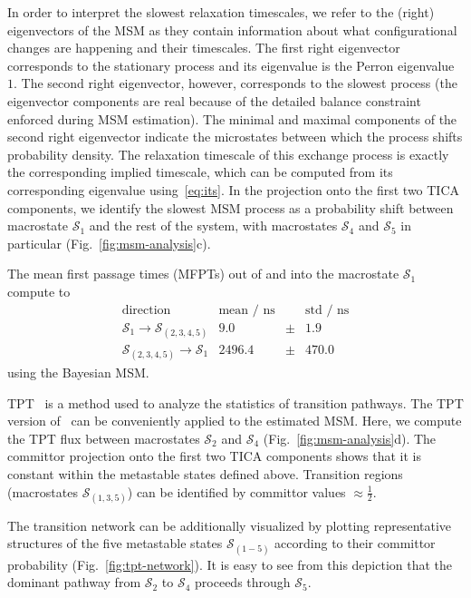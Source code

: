 \documentclass[9pt,tutorial]{livecoms}
\begin{document}
In order to interpret the slowest relaxation timescales, we refer to the (right) eigenvectors of the MSM as they contain information about what configurational changes are happening and their timescales.
The first right eigenvector corresponds to the stationary process and its eigenvalue is the Perron eigenvalue $1$.
The second right eigenvector, however, corresponds to the slowest process 
(the eigenvector components are real because of the detailed balance constraint enforced during MSM estimation).
The minimal and maximal components of the second right eigenvector indicate the microstates between which the process shifts probability density.
The relaxation timescale of this exchange process is exactly the corresponding implied timescale, which can be computed from its corresponding eigenvalue using~\eqref{eq:its}.
In the projection onto the first two TICA components, we identify the slowest MSM process as a probability shift between macrostate $\mathcal{S}_1$ and the rest of the system, with macrostates $\mathcal{S}_4$ and $\mathcal{S}_5$ in particular (Fig.~\ref{fig:msm-analysis}c).

The mean first passage times (MFPTs) out of and into the macrostate $\mathcal{S}_1$ compute to
\[ \begin{array}{crcr}
\textrm{direction} & \textrm{mean / ns} && \textrm{std / ns} \\
\hline
\mathcal{S}_1 \to \mathcal{S}_{(2,3,4,5)} & 9.0 & \pm & 1.9 \\
\mathcal{S}_{(2,3,4,5)} \to \mathcal{S}_1 & 2496.4 & \pm &  470.0
\end{array}\]
using the Bayesian MSM.

TPT~\cite{weinan-tpt,metzner-msm-tpt} is a method used to analyze the statistics of transition pathways. The TPT version of~\cite{noe-folding-pathways} can be conveniently applied to the estimated MSM. Here, we compute the TPT flux between macrostates $\mathcal{S}_2$ and $\mathcal{S}_4$ (Fig.~\ref{fig:msm-analysis}d).
The committor projection onto the first two TICA components shows that it is constant within the metastable states defined above.
Transition regions (macrostates $\mathcal{S}_{(1,3,5)}$) can be identified by committor values $\approx \frac{1}{2}$.

The transition network can be additionally visualized by plotting representative structures of the five metastable states $\mathcal{S}_{(1-5)}$ according to their committor probability (Fig.~\ref{fig:tpt-network}). It is easy to see from this depiction that the dominant pathway from $\mathcal{S}_2$ to $\mathcal{S}_4$ proceeds through $\mathcal{S}_5$.
\end{document}
